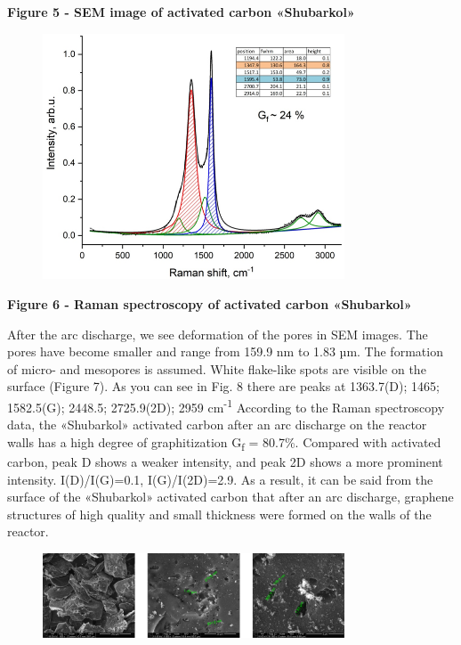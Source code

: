 {\bfseries Figure 5 - SEM image of activated carbon «Shubarkol»}

\begin{figure}[H]
	\centering
	\includegraphics[width=0.8\textwidth]{assets/58}
	\caption*{}
\end{figure}

{\bfseries Figure 6 - Raman spectroscopy of activated carbon «Shubarkol»}

After the arc discharge, we see deformation of the pores in SEM images.
The pores have become smaller and range from 159.9 nm to 1.83 µm. The
formation of micro- and mesopores is assumed. White flake-like spots are
visible on the surface (Figure 7). As you can see in Fig. 8 there are
peaks at 1363.7(D); 1465; 1582.5(G); 2448.5; 2725.9(2D); 2959
cm\textsuperscript{-1} According to the Raman spectroscopy data, the
«Shubarkol» activated carbon after an arc discharge on the reactor walls
has a high degree of graphitization G\textsubscript{f} = 80.7\%.
Compared with activated carbon, peak D shows a weaker intensity, and
peak 2D shows a more prominent intensity. I(D)/I(G)=0.1, I(G)/I(2D)=2.9.
As a result, it can be said from the surface of the «Shubarkol»
activated carbon that after an arc discharge, graphene structures of
high quality and small thickness were formed on the walls of the
reactor.

\begin{figure}[H]
	\centering
	\includegraphics[width=0.8\textwidth]{assets/59}
	\caption*{}
\end{figure}

